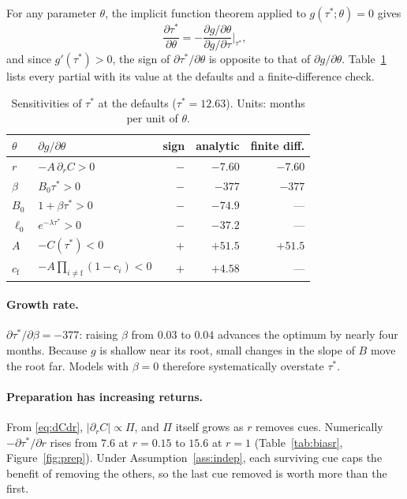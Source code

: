 \documentclass[11pt,a4paper]{article}
\theoremstyle{remark}
\newcommand{\cface}{c_{\mathrm{f}}}
\newcommand{\pderiv}[2]{\frac{\partial #1}{\partial #2}}
\begin{document}
For any parameter $\theta$, the implicit function theorem applied to $g(\tau^*;\theta)=0$ gives
\begin{equation}
  \pderiv{\tau^*}{\theta} = -\frac{\partial g/\partial\theta}{\partial g/\partial\tau}\bigg|_{\tau^*}, \label{eq:ift}
\end{equation}
and since $g'(\tau^*)>0$, the sign of $\partial\tau^*/\partial\theta$ is opposite to that of $\partial g/\partial\theta$. Table~\ref{tab:sens} lists every partial with its value at the defaults and a finite-difference check.

\begin{table}[t]
  \centering
  \caption{Sensitivities of $\tau^*$ at the defaults ($\tau^*=12.63$). Units: months per unit of $\theta$.}
  \label{tab:sens}
  \begin{tabular}{llrrr}
    \toprule
    $\theta$ & $\partial g/\partial\theta$ & sign & analytic & finite diff. \\
    \midrule
    $r$ & $-A\,\partial_r C>0$ & $-$ & $-7.60$ & $-7.60$ \\
    $\beta$ & $B_0\tau^*>0$ & $-$ & $-377$ & $-377$ \\
    $B_0$ & $1+\beta\tau^*>0$ & $-$ & $-74.9$ & --- \\
    $\ell_0$ & $e^{-\lambda\tau^*}>0$ & $-$ & $-37.2$ & --- \\
    $A$ & $-C(\tau^*)<0$ & $+$ & $+51.5$ & $+51.5$ \\
    $\cface$ & $-A\prod_{i\ne\mathrm{f}}(1-c_i)<0$ & $+$ & $+4.58$ & --- \\
    \bottomrule
  \end{tabular}
\end{table}

\paragraph{Growth rate.} $\partial\tau^*/\partial\beta=-377$: raising $\beta$ from $0.03$ to $0.04$ advances the optimum by nearly four months. Because $g$ is shallow near its root, small changes in the slope of $B$ move the root far. Models with $\beta=0$ therefore systematically overstate $\tau^*$.

\paragraph{Preparation has increasing returns.} From \eqref{eq:dCdr}, $|\partial_r C|\propto\Pi$, and $\Pi$ itself grows as $r$ removes cues. Numerically $-\partial\tau^*/\partial r$ rises from $7.6$ at $r=0.15$ to $15.6$ at $r=1$ (Table~\ref{tab:biasr}, Figure~\ref{fig:prep}). Under Assumption~\ref{ass:indep}, each surviving cue caps the benefit of removing the others, so the last cue removed is worth more than the first.
\end{document}

